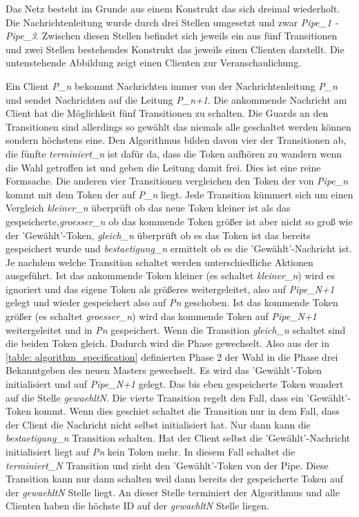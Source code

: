 Das Netz besteht im Grunde aus einem Konstrukt das sich dreimal wiederholt. Die Nachrichtenleitung wurde durch drei Stellen umgesetzt und zwar \textit{Pipe\_1 - Pipe\_3}. Zwischen diesen Stellen befindet sich jeweils ein aus fünf Transitionen und zwei Stellen bestehendes Konstrukt das jeweils einen Clienten darstellt. Die untenstehende Abbildung zeigt einen Clienten zur Veranschaulichung. 

Ein Client \textit{P\_{n}} bekommt Nachrichten immer von der Nachrichtenleitung \textit{P\_n} und sendet Nachrichten auf die Leitung \textit{P\_n+1}. Die ankommende Nachricht am Client hat die Möglichkeit fünf Transitionen zu schalten. Die Guards an den Transitionen sind allerdings so gewählt das niemals alle geschaltet werden können sondern höchstens eine. Den Algorithmus bilden davon vier der Transitionen ab, die fünfte \textit{terminiert\_n} ist dafür da, dass die Token aufhören zu wandern wenn die Wahl getroffen ist und geben die Leitung damit frei. Dies ist eine reine Formsache. Die anderen vier Transitionen vergleichen den Token der von \textit{Pipe\_n} kommt mit dem Token der auf \textit{P\_n} liegt. Jede Transition kümmert sich um einen Vergleich \textit{kleiner\_n} überprüft ob das neue Token kleiner ist als das gespeicherte,\textit{groesser\_n} ob das kommende Token größer ist aber nicht so groß wie der 'Gewählt'-Token, \textit{gleich\_n} überprüft ob es das Token ist das bereits gespeichert wurde und \textit{bestaetigung\_n} ermittelt ob es die 'Gewählt'-Nachricht ist. Je nachdem welche Transition schaltet werden unterschiedliche Aktionen ausgeführt. Ist das ankommende Token kleiner (es schaltet \textit{kleiner\_n}) wird es ignoriert und das eigene Token als größeres weitergeleitet, also auf \textit{Pipe\_N+1} gelegt und wieder gespeichert also auf \textit{Pn} geschoben. Ist das kommende Token größer (es schaltet \textit{groesser\_n}) wird das kommende Token auf \textit{Pipe\_N+1} weitergeleitet und in \textit{Pn} gespeichert. Wenn die Transition \textit{gleich\_n} schaltet sind die beiden Token gleich. Dadurch wird die Phase gewechselt. Also aus der  in \ref{table: algorithm_specification} definierten Phase 2 der Wahl in die Phase drei Bekanntgeben des neuen Masters gewechselt. Es wird das 'Gewählt'-Token initialisiert und auf \textit{Pipe\_N+1} gelegt. Das bis eben gespeicherte Token wandert auf die Stelle \textit{gewaehltN}. Die vierte Transition regelt den Fall, dass ein 'Gewählt'-Token kommt. Wenn dies geschiet schaltet die Transition nur in dem Fall, dass der Client die Nachricht nicht selbst initialisiert hat. Nur dann kann die \textit{bestaetigung\_n} Transition schalten. Hat der Client selbst die 'Gewählt'-Nachricht initialisiert liegt auf \textit{Pn} kein Token mehr. In diesem Fall schaltet die \textit{terminiert\_N} Transition und zieht den 'Gewählt'-Token von der Pipe. Diese Transition kann nur dann schalten weil dann bereits der gespeicherte Token auf der \textit{gewaehltN} Stelle liegt.
An dieser Stelle terminiert der Algorithmus und alle Clienten haben die höchste ID auf der \textit{gewaehltN} Stelle liegen.

